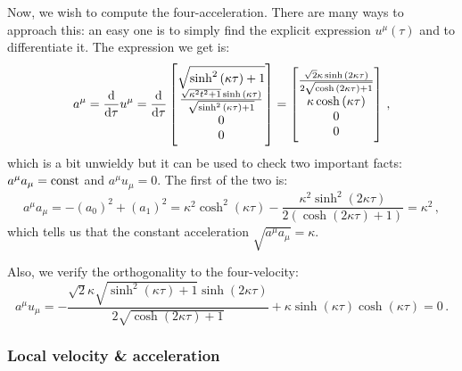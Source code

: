 \documentclass[main.tex]{subfiles}
\begin{document}
Now, we wish to compute the four-acceleration. There are many ways to approach this: an easy one is to simply find the explicit expression \(u^{\mu } (\tau )\) and to differentiate it. The expression we get is:
%
\begin{equation}
    a^{\mu } = \dv{}{\tau } u^{\mu } = \dv{}{\tau }   
  \begin{bmatrix}
    \sqrt{\sinh^{2}{\left(\kappa \tau \right)} + 1}
        \\
    \frac{\sqrt{\kappa^{2} t^{2} + 1} \sinh{\left(\kappa \tau \right)}}{\sqrt{\sinh^{2}{\left(\kappa \tau \right)} + 1}} \\
    0 \\
    0
  \end{bmatrix}
  =
  \begin{bmatrix}
    \frac{\sqrt{2} \kappa \sinh{\left(2 \kappa \tau \right)}}{2 \sqrt{\cosh{\left(2 \kappa \tau \right)} + 1}}
    \\
    \kappa \cosh \left(\kappa \tau \right)\\
    0 \\
    0
  \end{bmatrix}
\,,
\end{equation}
%
which is a bit unwieldy but it can be used to check two important facts: \(a^{\mu } a_{\mu } = \text{const} \) and \(a^{\mu }u_{\mu } = 0\). The first of the two is:
%
\begin{equation}
    a^{\mu }a_{\mu } = -(a_0 )^2 + (a_1 )^2 =
    \kappa^{2} \cosh^{2}{\left(\kappa \tau \right)} - \frac{\kappa^{2} \sinh^{2}{\left(2 \kappa \tau \right)}}{2 \left(\cosh{\left(2 \kappa \tau \right)} + 1\right)}
    = \kappa^2 
\,,
\end{equation}
%
which tells us that the constant acceleration \(\sqrt{a^{\mu }a_{\mu }} = \kappa \).

Also, we verify the orthogonality to the four-velocity: 
%
\begin{equation}
  a^{\mu }u_{\mu } = 
  - \frac{\sqrt{2} \kappa \sqrt{\sinh^{2}{\left(\kappa \tau \right)} + 1} \sinh{\left(2 \kappa \tau \right)}}{2 \sqrt{\cosh{\left(2 \kappa \tau \right)} + 1}} + \kappa \sinh{\left(\kappa \tau \right)} \cosh{\left(\kappa \tau \right)}
  = 0
\,.
\end{equation}

\subsubsection{Local velocity \& acceleration}
\end{document}
